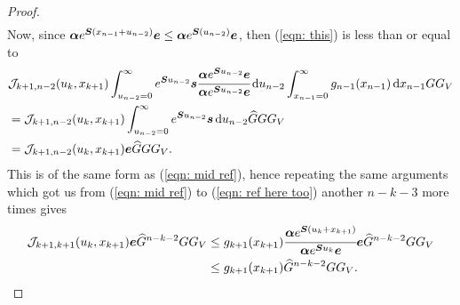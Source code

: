 \begin{proof}
\begin{align}
	\end{align}
	Now, since \(\boldsymbol\alpha e^{\boldsymbol{S}(x_{n-1}+u_{n-2})}\boldsymbol e\leq  \boldsymbol\alpha e^{\boldsymbol{S}(u_{n-2})}\boldsymbol e\), then (\ref{eqn: this}) is less than or equal to
	\begin{align}
		&\mathcal J_{k+1,n-2}(u_k,x_{k+1}) \int_{u_{n-2}=0}^\infty e^{\boldsymbol{S}u_{n-2}}\boldsymbol s \cfrac{\boldsymbol \alpha e^{\boldsymbol{S}u_{n-2}}\boldsymbol e}{\boldsymbol \alpha e^{\boldsymbol{S}u_{n-2}}\boldsymbol e}\, \mathrm{d} u_{n-2}  \int_{x_{n-1}=0}^\infty g_{n-1}(x_{n-1})\, \mathrm{d} x_{n-1} G  G_V\nonumber
		\\& = \mathcal J_{k+1,n-2}(u_k,x_{k+1}) \int_{u_{n-2}=0}^\infty e^{\boldsymbol{S}u_{n-2}}\boldsymbol s \, \mathrm{d} u_{n-2} \widehat G G G_V \nonumber
		\\& = \mathcal J_{k+1,n-2}(u_k,x_{k+1}) \boldsymbol e \widehat G G G_V. \label{eqn: ref here too}
	\end{align} 
	This is of the same form as (\ref{eqn: mid ref}), hence repeating the same arguments which got us from (\ref{eqn: mid ref}) to (\ref{eqn: ref here too}) another \(n-k-3\) more times gives
	 \begin{align}
		\mathcal J_{k+1,k+1}(u_k,x_{k+1}) \boldsymbol e  \widehat G^{n-k-2}G G_V
		&\leq g_{k+1}(x_{k+1}) \cfrac{\boldsymbol\alpha e^{\boldsymbol{S}(u_k+x_{k+1})}}{\boldsymbol \alpha e^{\boldsymbol{S}u_k}\boldsymbol e} \boldsymbol e\widehat G^{n-k-2}G G_V
		\\& \leq g_{k+1}(x_{k+1}) \widehat G^{n-k-2}G G_V.
	\end{align} 
\end{proof}	
